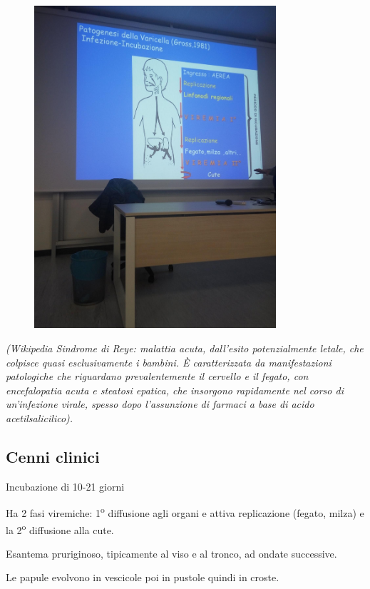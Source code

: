 \begin{figure}[!ht]
\centering
	\includegraphics[width=0.8\textwidth]{07/image4.jpeg}
	\end{figure}

\emph{(Wikipedia
Sindrome di Reye: malattia acuta, dall'esito potenzialmente letale, che
colpisce quasi esclusivamente i bambini. È caratterizzata da
manifestazioni patologiche che riguardano prevalentemente il cervello e
il fegato, con encefalopatia acuta e steatosi epatica, che insorgono
rapidamente nel corso di un'infezione virale, spesso dopo l'assunzione
di farmaci a base di acido acetilsalicilico).}

\subsection{Cenni clinici}

Incubazione di 10-21 giorni

Ha 2 fasi viremiche: 1\textsuperscript{o} diffusione agli organi e attiva replicazione
(fegato, milza) e la 2\textsuperscript{o} diffusione alla cute.

Esantema pruriginoso, tipicamente al viso e al tronco, ad ondate
successive.

Le papule evolvono in vescicole poi in pustole quindi in croste.

